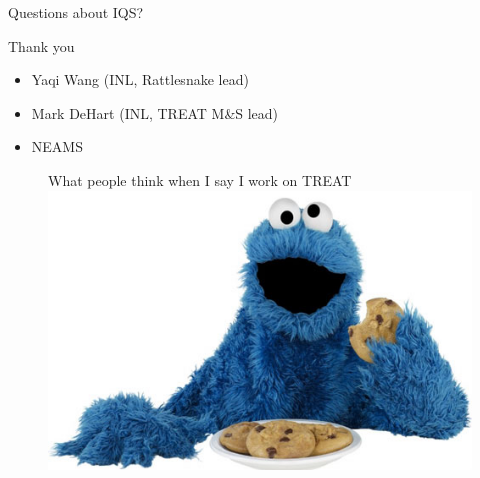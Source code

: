 \documentclass[8pt,xcolor=dvipnames]{beamer}
\begin{document}
\begin{frame}{Questions about IQS?}

\begin{block}{Thank you}
\begin{itemize}
\item Yaqi Wang (INL, Rattlesnake lead)
\item Mark DeHart (INL, TREAT M\&S lead)
\item NEAMS
\end{itemize}
\end{block}

\begin{block}{}
\begin{figure}
	What people think when I say I work on TREAT \\
	\centering
	\includegraphics[scale=0.35]{figures/cookie_monster.jpg}
\end{figure}
\end{block}


\end{frame}
\end{document}
